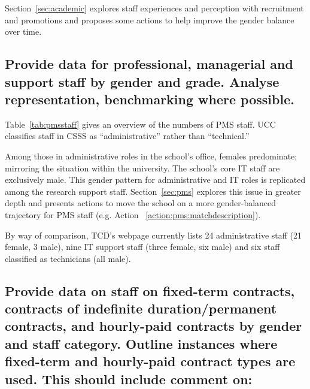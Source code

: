 Section~\ref{sec:academic} explores staff experiences
and perception with recruitment and  promotions and proposes
some actions to help improve the gender balance over time. 





\subsection{Provide data for professional, managerial and support staff by gender and grade. Analyse representation, benchmarking where possible.}



Table~\ref{tab:pmsstaff} gives an overview of the numbers of \ac{PMS} staff. UCC  classifies
staff in  \ac{CSSS} as ``administrative'' rather than 
``technical.''



Among those in administrative roles in the school's office, 
females predominate; mirroring the situation within the university.
The school's core IT staff are exclusively male. This gender
pattern for administrative and IT roles is replicated among the 
research support staff.
Section~\ref{sec:pms} explores this issue in greater depth 
and presents actions to move the school on a more gender-balanced
trajectory for PMS staff
(e.g. Action
~\ref{action:pms:matchdescription}).

By way of comparison, TCD's webpage currently lists 24 administrative 
staff (21 female, 3 male), nine IT support staff (three female, six
male) and six staff classified as technicians (all male).



\subsection{Provide data on staff on fixed-term contracts, contracts of indefinite duration/permanent contracts, and hourly-paid contracts by gender and staff category. Outline instances where fixed-term and hourly-paid contract types are used. This should include comment on:}


